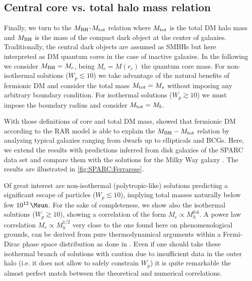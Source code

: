 \subsection{Central core vs. total halo mass relation}
\label{sec:parameter-corelation:ferrarese}


Finally, we turn to the $M_{\rm BH}$-$M_{\rm tot}$ relation \citep{2002ApJ...578...90F,2011Natur.469..377K,2015ApJ...800..124B} where $M_{\rm tot}$ is the total DM halo mass and $M_{\rm BH}$ is the mass of the compact dark object at the center of galaxies. Traditionally, the central dark objects are assumed as SMBHs but here interpreted as DM quantum cores in the case of inactive galaxies. In the following we consider $M_{\rm BH} = M_c$, being $M_c = M(r_c)$ the quantum core mass. For non-isothermal solutions ($W_p \lesssim 10$) we take advantage of the natural benefits of fermionic DM and consider the total mass $M_{\rm tot} = M_s$ without imposing any arbitrary boundary condition. For isothermal solutions ($W_p \gtrsim 10$) we must impose the boundary radius and consider $M_{\rm tot} = M_b$.

With those definitions of core and total DM mass, \citet{2019PDU....24..278A} showed that fermionic DM according to the RAR model is able to explain the $M_{\rm BH} - M_{\rm tot}$ relation by analyzing typical galaxies ranging from dwarfs up to ellipticals and BCGs. Here, we extend the results with predictions inferred from disk galaxies of the SPARC data set and compare them with the solutions for the Milky Way galaxy \citep{2018PDU....21...82A}. The results are illustrated in \cref{fig:SPARC:Ferrarese}.

Of great interest are non-isothermal (polytropic-like) solutions predicting a significant escape of particles ($W_p \lesssim 10$), implying total masses naturally below few $\SI{E12}{\Msun}$. For the sake of completeness, we show also the isothermal solutions ($W_p \gtrsim 10$), showing a correlation of the form $M_c \propto M_h^{0.6}$. A power law correlation $M_c \propto M_h^{1/2}$ very close to the one found here on phenomenological grounds, can be derived from pure thermodynamical arguments within a Fermi-Dirac phase space distribution as done in \cite{2019PhRvD.100l3506C}. Even if one should take these isothermal branch of solutions with caution due to insufficient data in the outer halo (i.e. it does not allow to safely constrain $W_p$) it is quite remarkable the almost perfect match between the theoretical and numerical correlations.

